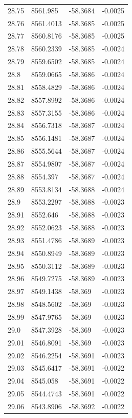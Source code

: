 \begin{table}[H]
\begin{tabular}{llll}
28.75 & 8561.985 & -58.3684 & -0.0025 \\
28.76 & 8561.4013 & -58.3685 & -0.0025 \\
28.77 & 8560.8176 & -58.3685 & -0.0025 \\
28.78 & 8560.2339 & -58.3685 & -0.0024 \\
28.79 & 8559.6502 & -58.3685 & -0.0024 \\
28.8 & 8559.0665 & -58.3686 & -0.0024 \\
28.81 & 8558.4829 & -58.3686 & -0.0024 \\
28.82 & 8557.8992 & -58.3686 & -0.0024 \\
28.83 & 8557.3155 & -58.3686 & -0.0024 \\
28.84 & 8556.7318 & -58.3687 & -0.0024 \\
28.85 & 8556.1481 & -58.3687 & -0.0024 \\
28.86 & 8555.5644 & -58.3687 & -0.0024 \\
28.87 & 8554.9807 & -58.3687 & -0.0024 \\
28.88 & 8554.397 & -58.3687 & -0.0024 \\
28.89 & 8553.8134 & -58.3688 & -0.0024 \\
28.9 & 8553.2297 & -58.3688 & -0.0023 \\
28.91 & 8552.646 & -58.3688 & -0.0023 \\
28.92 & 8552.0623 & -58.3688 & -0.0023 \\
28.93 & 8551.4786 & -58.3689 & -0.0023 \\
28.94 & 8550.8949 & -58.3689 & -0.0023 \\
28.95 & 8550.3112 & -58.3689 & -0.0023 \\
28.96 & 8549.7275 & -58.3689 & -0.0023 \\
28.97 & 8549.1438 & -58.369 & -0.0023 \\
28.98 & 8548.5602 & -58.369 & -0.0023 \\
28.99 & 8547.9765 & -58.369 & -0.0023 \\
29.0 & 8547.3928 & -58.369 & -0.0023 \\
29.01 & 8546.8091 & -58.369 & -0.0023 \\
29.02 & 8546.2254 & -58.3691 & -0.0023 \\
29.03 & 8545.6417 & -58.3691 & -0.0022 \\
29.04 & 8545.058 & -58.3691 & -0.0022 \\
29.05 & 8544.4743 & -58.3691 & -0.0022 \\
29.06 & 8543.8906 & -58.3692 & -0.0022 \\

\end{tabular}
\end{table}
